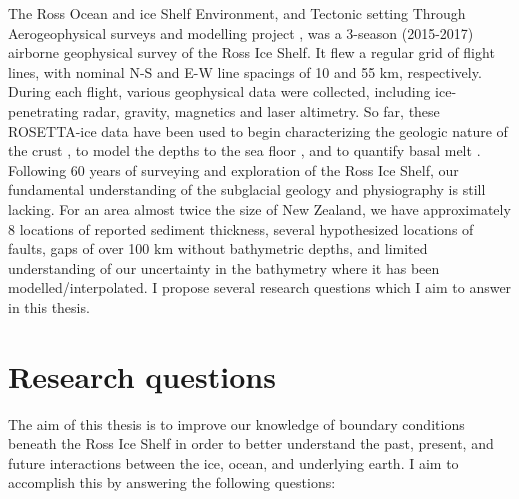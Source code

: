 The Ross Ocean and ice Shelf Environment, and Tectonic setting Through Aerogeophysical surveys and modelling project \citep[ROSETTA-ice,][]{tintoross2019}, was a 3-season (2015-2017) airborne geophysical survey of the Ross Ice Shelf. It flew a regular grid of flight lines, with nominal N-S and E-W line spacings of 10 and 55 km, respectively. During each flight, various geophysical data were collected, including ice-penetrating radar, gravity, magnetics and laser altimetry. So far, these ROSETTA-ice data have been used to begin characterizing the geologic nature of the crust \citep{tintoross2019}, to model the depths to the sea floor \citep{tintoross2019}, and to quantify basal melt \citep{dasmulti2020}. \\

Following 60 years of surveying and exploration of the Ross Ice Shelf, our fundamental understanding of the subglacial geology and physiography is still lacking. For an area almost twice the size of New Zealand, we have approximately 8 locations of reported sediment thickness, several hypothesized locations of faults, gaps of over 100 km without bathymetric depths, and limited understanding of our uncertainty in the bathymetry where it has been modelled/interpolated. I propose several research questions which I aim to answer in this thesis.

    

\section{Research questions}
    
The aim of this thesis is to improve our knowledge of boundary conditions beneath the Ross Ice Shelf in order to better understand the past, present, and future interactions between the ice, ocean, and underlying earth. I aim to accomplish this by answering the following questions:


